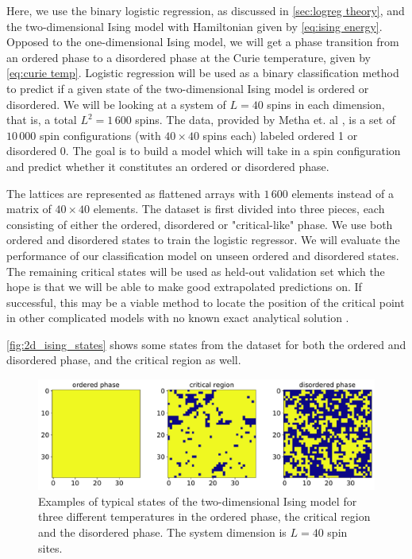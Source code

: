 Here, we use the binary logistic regression, as discussed in \autoref{sec:logreg theory}, and the two-dimensional Ising model with Hamiltonian given by \autoref{eq:ising energy}. Opposed to the one-dimensional Ising model, we will get a phase transition from an ordered phase to a disordered phase at the Curie temperature, given by \autoref{eq:curie temp}. Logistic regression will be used as a binary classification method to predict if a given state of the two-dimensional Ising model is ordered or disordered. We will be looking at a system of $L=40$ spins in each dimension, that is, a total $L^2 = 1\,600$ spins. The data, provided by Metha et. al \cite{Mehta_2019}, is a set of $10 \,000$ spin configurations (with $40 \times 40$ spins each) labeled ordered 1 or disordered 0. The goal is to build a model which will take in a spin configuration and predict whether it constitutes an ordered or disordered phase. 

The lattices are represented as flattened arrays with $1\,600$ elements instead of a matrix of $40 \times 40$ elements. The dataset is first divided into three pieces, each consisting of either the ordered, disordered or "critical-like" phase. We use both ordered and disordered states to train the logistic regressor. We will evaluate the performance of our classification model on unseen ordered and disordered states. The remaining critical states will be used as held-out validation set which the hope is that we will be able to make good extrapolated predictions on. If successful, this may be a viable method to locate the position of the critical point in other complicated models with no known exact analytical solution \cite{Mehta_2019}.

\autoref{fig:2d_ising_states} shows some states from the dataset for both the ordered and disordered phase, and the critical region as well. 

\begin{figure}[H]
\begin{center}\includegraphics[scale=0.5]{latex/figures/ising_states.pdf}
\end{center}
\caption{Examples of typical states of the two-dimensional Ising model for three different temperatures in the ordered phase, the critical region and the disordered phase. The system dimension is $L=40$ spin sites.}
\label{fig:2d_ising_states}
\end{figure}

